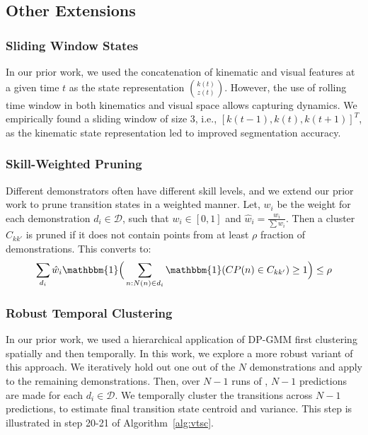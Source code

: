 \documentclass[0-main.tex]{subfiles}
\begin{document}
\subsection{Other Extensions}
\subsubsection{Sliding Window States}
In our prior work, we used the concatenation of kinematic and visual features at a given time $t$ as the state representation $\binom{k(t)}{z(t)}$. However, the use of rolling time window in both kinematics and visual space allows capturing dynamics. 
We empirically found a sliding window of size 3, i.e.,  $[k(t-1), k(t), k(t+1)]^T$, as the kinematic state representation led to improved segmentation accuracy. 

\subsubsection{Skill-Weighted Pruning} 
Different demonstrators often have different skill levels, and we extend our prior work to prune transition states in a weighted manner.
Let, $w_i$ be the weight for each demonstration $d_i \in \mathcal{D}$, such that $w_i \in [0,1]$ and $\hat{w}_i = \frac{w_i}{\sum w_i}$. Then a cluster $C_{kk'}$ is pruned if it does not contain points from at least $\rho$ fraction of demonstrations. This converts to:
\vspace{-3pt}
\[\sum_{d_i} \hat{w}_i\mathbbm{1}\Big( \sum_{n:N(n)\in d_i} \mathbbm{1}( CP(n) \in C_{kk'}) \geq 1 \Big) \leq \rho 
\]
\vspace{-5pt}

\subsubsection{Robust Temporal Clustering}
In our prior work, we used a hierarchical application of DP-GMM first clustering spatially and then temporally. In this work, we explore a more robust variant of this approach.
We iteratively hold out one out of the $N$ demonstrations and apply \tsc to the remaining demonstrations.
Then, over $N-1$ runs of \tsc, $N-1$ predictions are made for each $d_i \in \mathcal{D}$. We temporally cluster the transitions across $N-1$ predictions, to estimate final transition state centroid and variance. This step is illustrated in step 20-21 of Algorithm~\ref{alg:vtsc}.

\end{document}

